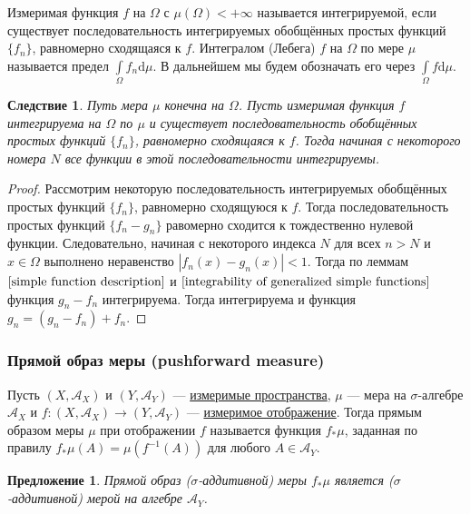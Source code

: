 \documentclass[12pt]{article}
\newtheorem{proposition}[theorem]{Предложение}
\newtheorem{corollary}[theorem]{Следствие}
\numberwithin{theorem}{section}
\theoremstyle{definition}
\newcommand{\calA}{\mathcal{A}}
\newcommand{\defin}[2]{\hypertarget{#2}{{\color{red} #1}}}
\newcommand{\diff}{\mathrm{d}}
\begin{document}
	Измеримая функция $ f $ на $ \Omega $ с $ \mu(\Omega) < +\infty $ называется \defin{интегрируемой}{integrable},
	если существует последовательность интегрируемых обобщённых простых функций $ \{f_n\} $,
	равномерно сходящаяся к $ f $. \defin{Интегралом (Лебега) $ f $ на $ \Omega $ по мере $ \mu $}{integral} 
	называется предел $ \int\limits_{\Omega} f_n \diff\mu $. В дальнейшем мы будем обозначать его через $ \int\limits_{\Omega} f\diff\mu $.
	
	\begin{corollary} \label{any sequence}
		Путь мера $ \mu $ конечна на $ \Omega $.
		Пусть измеримая функция $ f $ интегрируема на $ \Omega $ по $ \mu $
		и существует последовательность обобщённых простых функций $ \{f_n\} $, равномерно сходящаяся к $ f $.
		Тогда начиная с некоторого номера $ N $ все функции в этой последовательности интегрируемы.
	\end{corollary}
	
	\begin{proof}
		Рассмотрим некоторую последовательность интегрируемых обобщённых простых функций $ \{f_n\} $,
		равномерно сходящуюся к $ f $.
		Тогда последовательность простых функций $ \{f_n - g_n\} $ равомерно сходится к тождественно нулевой функции.
		Следовательно, начиная с некоторого индекса $ N $ для всех $ n > N $ и $ x \in \Omega $ выполнено неравенство
		$ |f_n(x) - g_n(x)| < 1 $.
		Тогда по леммам $ \ref{simple function description} $ и $ \ref{integrability of generalized simple functions} $ функция $ g_n - f_n $ интегрируема. Тогда интегрируема и функция $ g_n = (g_n - f_n) + f_n $.
	\end{proof}
	
	\subsubsection{Прямой образ меры (pushforward measure)}
	
	Пусть $ (X, \calA_X) $ и $ (Y, \calA_Y) $ --- \hyperlink{measurable-space}{измеримые пространства},
	$ \mu $ --- мера на $ \sigma $-алгебре $ \calA_X $ и $ f \colon (X, \calA_X) \to (Y, \calA_Y) $
	--- \hyperlink{morphism-of-measurable-spaces}{измеримое отображение}.
	Тогда \defin{прямым образом меры $ \mu $ при отображении $ f $}{pushforward-measure} называется функция $ f_{*}\mu $,
	заданная по правилу $ f_*\mu(A) = \mu(f^{-1}(A)) $ для любого $ A \in \calA_Y $.
	
	\begin{proposition}
		Прямой образ ($ \sigma $-аддитивной) меры $ f_*\mu $ является ($ \sigma $-аддитивной) мерой на алгебре $ \calA_Y $.
	\end{proposition}
	
\end{document}

